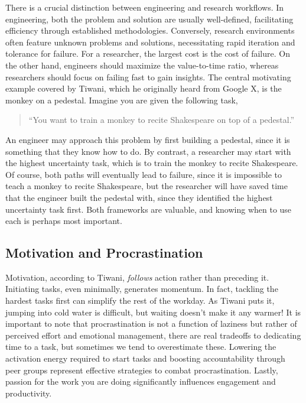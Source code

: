 There is a crucial distinction between engineering and research workflows.
In engineering, both the problem and solution are usually well-defined, facilitating efficiency through established methodologies.
Conversely, research environments often feature unknown problems and solutions, necessitating rapid iteration and tolerance for failure.
For a researcher, the largest cost is the cost of failure.
On the other hand, engineers should maximize the value-to-time ratio, whereas researchers should focus on failing fast to gain insights.
The central motivating example covered by Tiwani, which he originally heard from Google X, is the monkey on a pedestal.
Imagine you are given the following task,
\begin{quote}
\small
``You want to train a monkey to recite Shakespeare on top of a pedestal.''
\end{quote}
An engineer may approach this problem by first building a pedestal, since it is something that they know how to do.
By contrast, a researcher may start with the highest uncertainty task, which is to train the monkey to recite Shakespeare.
Of course, both paths will eventually lead to failure, since it is impossible to teach a monkey to recite Shakespeare, but the researcher will have saved time that the engineer built the pedestal with, since they identified the highest uncertainty task first.
Both frameworks are valuable, and knowing when to use each is perhaps most important.

\subsection{Motivation and Procrastination}

Motivation, according to Tiwani, \textit{follows} action rather than preceding it.
Initiating tasks, even minimally, generates momentum.
In fact, tackling the hardest tasks first can simplify the rest of the workday.
As Tiwani puts it, jumping into cold water is difficult, but waiting doesn't make it any warmer!
It is important to note that procrastination is not a function of laziness but rather of perceived effort and emotional management, there are real tradeoffs to dedicating time to a task, but sometimes we tend to overestimate these.
Lowering the activation energy required to start tasks and boosting accountability through peer groups represent effective strategies to combat procrastination.
Lastly, passion for the work you are doing significantly influences engagement and productivity.


